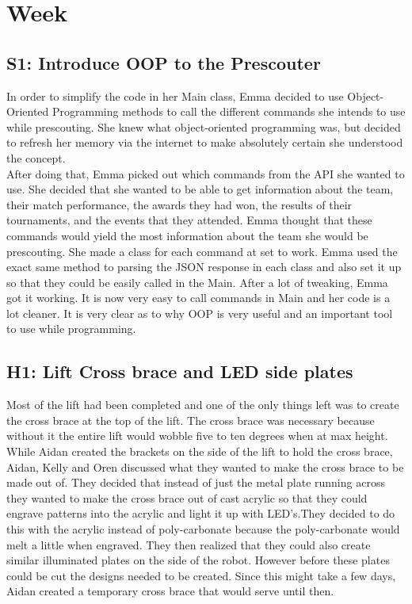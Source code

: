 \documentclass{article}
\begin{document}
\clearpage \newpage \section{Week \thesection} 
\subsection{S1: Introduce OOP to the Prescouter}

In order to simplify the code in her Main class, Emma decided to use Object-Oriented Programming methods to call the different commands she intends to use while prescouting. She knew what object-oriented programming was, but decided to refresh her memory via the internet to make absolutely certain she understood the concept. \\

After doing that, Emma picked out which commands from the API she wanted to use. She decided that she wanted to be able to get information about the team, their match performance, the awards they had won, the results of their tournaments, and the events that they attended. Emma thought that these commands would yield the most information about the team she would be prescouting. She made a class for each command at set to work. Emma used the exact same method to parsing the JSON response in each class and also set it up so that they could be easily called in the Main. After a lot of tweaking, Emma got it working. It is now very easy to call commands in Main and her code is a lot cleaner. It is very clear as to why OOP is very useful and an important tool to use while programming. 
\subsection{H1: Lift Cross brace and LED side plates}

Most of the lift had been completed and one of the only things left was to create the cross brace at the top of the lift. The cross brace was necessary because without it the entire lift would wobble five to ten degrees when at max height. While Aidan created the brackets on the side of the lift to hold the cross brace, Aidan, Kelly and Oren discussed what they wanted to make the cross brace to be made out of. They decided that instead of just the metal plate running across they wanted to make the cross brace out of cast acrylic so that they could engrave patterns into the acrylic and light it up with LED's.They decided to do this with the acrylic instead of poly-carbonate because the poly-carbonate would melt a little when engraved. They then realized that they could also create similar illuminated plates on the side of the robot. However before these plates could be cut the designs needed to be created. Since this might take a few days, Aidan created a temporary cross brace that would serve until then.
\end{document}
